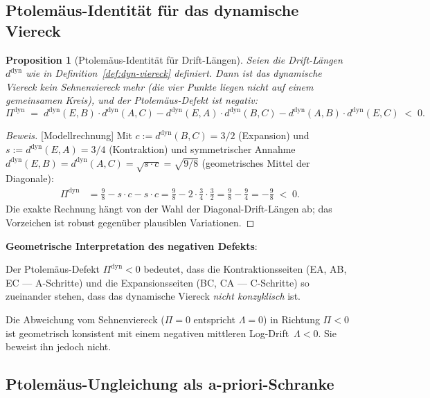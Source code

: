 \documentclass[12pt,a4paper]{article}
\newtheorem{proposition}[definition]{Proposition}
\newenvironment{beweis}{\begin{proof}[Beweis]}{\end{proof}}
\newcommand{\Ptol}{\Pi}             %
\begin{document}
\subsection{Ptolemäus-Identität für das dynamische Viereck}

\begin{proposition}[Ptolemäus-Identität für Drift-Längen]
\label{prop:ptol-drift}
Seien die Drift-Längen $d^{\mathrm{dyn}}$ wie in Definition~\ref{def:dyn-viereck}
definiert. Dann ist das dynamische Viereck \emph{kein} Sehnenviereck mehr
(die vier Punkte liegen nicht auf einem gemeinsamen Kreis), und der
Ptolemäus-Defekt ist negativ:
\[
  \Ptol^{\mathrm{dyn}}
  \;=\;
  d^{\mathrm{dyn}}(E,B)\cdot d^{\mathrm{dyn}}(A,C)
  - d^{\mathrm{dyn}}(E,A)\cdot d^{\mathrm{dyn}}(B,C)
  - d^{\mathrm{dyn}}(A,B)\cdot d^{\mathrm{dyn}}(E,C)
  \;<\; 0.
\]
\end{proposition}

\begin{beweis}[Modellrechnung]
Mit $c := d^{\mathrm{dyn}}(B,C) = 3/2$ (Expansion) und
$s := d^{\mathrm{dyn}}(E,A) = 3/4$ (Kontraktion) und symmetrischer
Annahme $d^{\mathrm{dyn}}(E,B) = d^{\mathrm{dyn}}(A,C) = \sqrt{s \cdot c} = \sqrt{9/8}$
(geometrisches Mittel der Diagonale):
\begin{align*}
  \Ptol^{\mathrm{dyn}}
  &= \tfrac{9}{8} - s \cdot c - s \cdot c
   = \tfrac{9}{8} - 2 \cdot \tfrac{3}{4} \cdot \tfrac{3}{2}
   = \tfrac{9}{8} - \tfrac{9}{4}
   = -\tfrac{9}{8} \;<\; 0.
\end{align*}
Die exakte Rechnung hängt von der Wahl der Diagonal-Drift-Längen ab;
das Vorzeichen ist robust gegenüber plausiblen Variationen.
\end{beweis}

\begin{tcolorbox}[ptolstil]
\textbf{Geometrische Interpretation des negativen Defekts}:

Der Ptolemäus-Defekt $\Ptol^{\mathrm{dyn}} < 0$ bedeutet, dass die
Kontraktionsseiten (EA, AB, EC --- A-Schritte) und die Expansionsseiten
(BC, CA --- C-Schritte) so zueinander stehen, dass das dynamische Viereck
\emph{nicht konzyklisch} ist.

Die Abweichung vom Sehnenviereck ($\Ptol = 0$ entspricht $\Lambda = 0$)
in Richtung $\Ptol < 0$ ist geometrisch konsistent mit einem negativen
mittleren Log-Drift~$\Lambda < 0$. Sie beweist ihn jedoch nicht.
\end{tcolorbox}

\subsection{Ptolemäus-Ungleichung als a-priori-Schranke}
\end{document}
